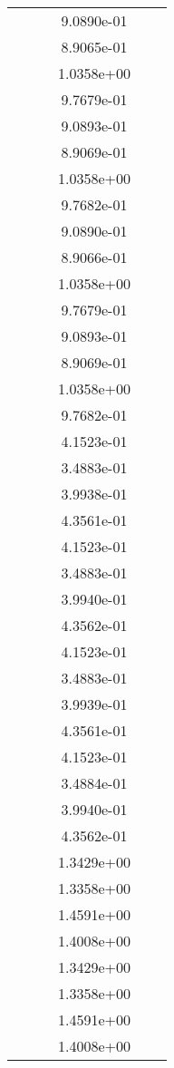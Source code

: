 \begin{xltabular}{\textwidth}{r|rS[table-format=1.3e+2]S[table-format=1.4e+2]S[table-format=1.4e+2]S[table-format=-1.5]}
&  &  & 9.0890e-01 & & \\
&  &  & 8.9065e-01 & & \\
&  &  & 1.0358e+00 & & \\
&  &  & 9.7679e-01 & & \\
&  &  & 9.0893e-01 & & \\
&  &  & 8.9069e-01 & & \\
&  &  & 1.0358e+00 & & \\
&  &  & 9.7682e-01 & & \\
&  &  & 9.0890e-01 & & \\
&  &  & 8.9066e-01 & & \\
&  &  & 1.0358e+00 & & \\
&  &  & 9.7679e-01 & & \\
&  &  & 9.0893e-01 & & \\
&  &  & 8.9069e-01 & & \\
&  &  & 1.0358e+00 & & \\
&  &  & 9.7682e-01 & & \\
&  &  & 4.1523e-01 & & \\
&  &  & 3.4883e-01 & & \\
&  &  & 3.9938e-01 & & \\
&  &  & 4.3561e-01 & & \\
&  &  & 4.1523e-01 & & \\
&  &  & 3.4883e-01 & & \\
&  &  & 3.9940e-01 & & \\
&  &  & 4.3562e-01 & & \\
&  &  & 4.1523e-01 & & \\
&  &  & 3.4883e-01 & & \\
&  &  & 3.9939e-01 & & \\
&  &  & 4.3561e-01 & & \\
&  &  & 4.1523e-01 & & \\
&  &  & 3.4884e-01 & & \\
&  &  & 3.9940e-01 & & \\
&  &  & 4.3562e-01 & & \\
&  &  & 1.3429e+00 & & \\
&  &  & 1.3358e+00 & & \\
&  &  & 1.4591e+00 & & \\
&  &  & 1.4008e+00 & & \\
&  &  & 1.3429e+00 & & \\
&  &  & 1.3358e+00 & & \\
&  &  & 1.4591e+00 & & \\
&  &  & 1.4008e+00 & & \\

\end{xltabular}
